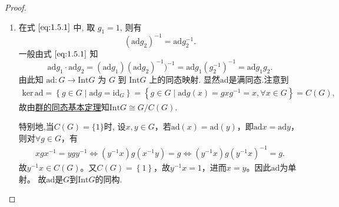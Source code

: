 \documentclass[../../main.tex]{subfiles}%
\begin{document}
\begin{proof}
\begin{enumerate}[(1)]
\item 在式 \(\eqref{eq:1.5.1}\) 中, 取 \( g_1 = 1 \), 则有
\[
(\text{ad}g_2)^{-1} = \text{ad}g_2^{-1}.
\]
一般由式 \(\eqref{eq:1.5.1}\) 知
\[
\text{ad}g_1 \cdot \text{ad}g_2 = (\text{ad}g_1)(\text{ad}g_2)^{-1})^{-1} = \text{ad}g_1(g_2^{-1})^{-1} = \text{ad}g_1g_2.
\]
由此知 \( \text{ad}: G \to \text{Int}G \) 为 \( G \) 到 \( \text{Int}G \) 上的同态映射.
显然$\text{ad}$是满同态.注意到
\begin{align*}
\mathrm{ker}\,\mathrm{ad}=\left\{ g\in G\mid \mathrm{ad}g=\mathrm{id}_G \right\} =\left\{ g\in G\mid \mathrm{ad}g\left( x \right) =gxg^{-1}=x,\forall x\in G \right\} =C\left( G \right) ,
\end{align*}
故由\hyperref[theorem:群的同态基本定理]{群的同态基本定理}知$\mathrm{Int}G\cong G/C\left( G \right)$.

特别地,当$C(G)=\{1\}$时,
设$x,y\in G$，若$\mathrm{ad}(x)=\mathrm{ad}(y)$，即$\mathrm{ad}x=\mathrm{ad}y$，则对$\forall g\in G$，有
\begin{align*}
xgx^{-1}=ygy^{-1}\Longleftrightarrow \left( y^{-1}x \right) g\left( x^{-1}y \right) =g\Longleftrightarrow \left( y^{-1}x \right) g\left( y^{-1}x \right) ^{-1}=g.
\end{align*}
故$y^{-1}x\in C\left( G \right)$。又$C\left( G \right) =\left\{ 1 \right\}$，故$y^{-1}x=1$，进而$x=y$。因此$\mathrm{ad}$为单射。
故$\text{ad}$是$G$到$\text{Int}G$的同构.
\end{enumerate}

\end{proof}
\end{document}
